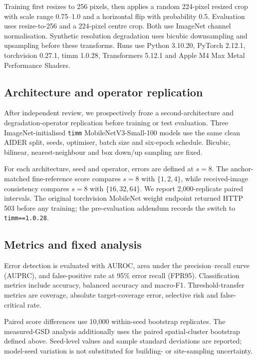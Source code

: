Training first resizes to 256 pixels, then applies a random 224-pixel resized
crop with scale range 0.75--1.0 and a horizontal flip with probability 0.5.
Evaluation uses resize-to-256 and a 224-pixel centre crop. Both use ImageNet
channel normalisation. Synthetic resolution degradation uses bicubic
downsampling and upsampling before these transforms. Runs use Python 3.10.20,
PyTorch 2.12.1, torchvision 0.27.1, timm 1.0.28, Transformers 5.12.1 and
Apple M4 Max Metal Performance Shaders.

\subsection{Architecture and operator replication}

After independent review, we prospectively froze a second-architecture and
degradation-operator replication before training or test evaluation. Three
ImageNet-initialised \texttt{timm} MobileNetV3-Small-100 models use the same
clean AIDER split, seeds, optimiser, batch size and six-epoch schedule.
Bicubic, bilinear, nearest-neighbour and box down/up sampling are fixed.

For each architecture, seed and operator, errors are defined at \(s=8\). The
anchor-matched fine-reference score compares \(s=8\) with
\(\{1,2,4\}\), while received-image consistency compares \(s=8\) with
\(\{16,32,64\}\). We report 2,000-replicate paired intervals. The original
torchvision MobileNet weight endpoint returned HTTP 503 before any training;
the pre-evaluation addendum records the switch to
\texttt{timm==1.0.28}.

\subsection{Metrics and fixed analysis}

Error detection is evaluated with AUROC, area under the precision--recall curve
(AUPRC), and false-positive rate at 95\% error recall (FPR95). Classification
metrics include accuracy, balanced accuracy and macro-F1. Threshold-transfer
metrics are coverage, absolute target-coverage error, selective risk and
false-critical rate.

Paired score differences use 10,000 within-seed bootstrap replicates. The
measured-GSD analysis additionally uses the paired spatial-cluster bootstrap
defined above. Seed-level values and sample standard deviations are reported;
model-seed variation is not substituted for building- or site-sampling
uncertainty.

